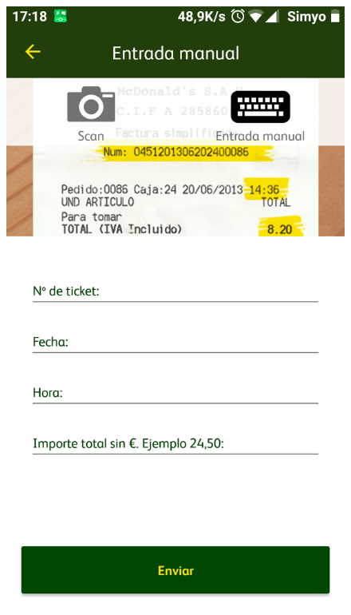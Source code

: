 \documentclass[twoside]{report}
\begin{document}
\begin{figure}[H]
\begin{center}
\includegraphics[scale=0.10]{images/restaurantes/mcdo2.png}

\end{center}
\end{figure}
\end{document}
